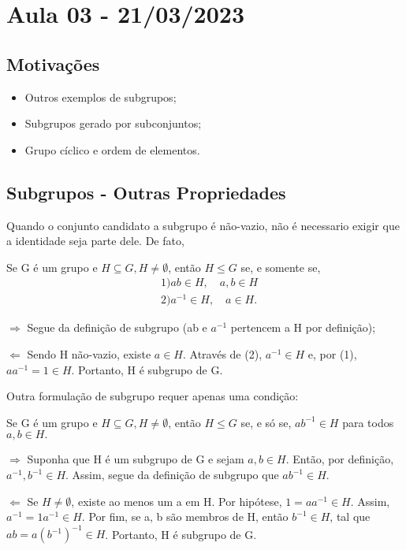 \documentclass[Algebra/algebra_notes.tex]{subfiles}
\begin{document}
\section{Aula 03 - 21/03/2023}
\subsection{Motivações}
\begin{itemize}
	\item Outros exemplos de subgrupos;
	\item Subgrupos gerado por subconjuntos;
	\item Grupo cíclico e ordem de elementos.
\end{itemize}
\subsection{Subgrupos - Outras Propriedades}
Quando o conjunto candidato a subgrupo é não-vazio, não é necessario exigir que a identidade seja parte dele. De fato,
\begin{prop*}
	Se G é um grupo e $H\subseteq{G}, H \neq\emptyset$, então $H\leq{G}$ se, e somente se,
	\begin{align*}
		 & 1) ab\in H, \quad a, b\in H   \\
		 & 2) a^{-1}\in H, \quad a\in H.
	\end{align*}
\end{prop*}
\begin{proof*}
	$\Rightarrow$ Segue da definição de subgrupo (ab e $a^{-1}$ pertencem a H por definição);

	$\Leftarrow$ Sendo H não-vazio, existe $a\in H$. Através de (2), $a^{-1}\in H$ e, por (1), $aa^{-1} = 1\in H.$ Portanto,
	H é subgrupo de G. \qedsymbol
\end{proof*}
Outra formulação de subgrupo requer apenas uma condição:
\begin{prop*}
	Se G é um grupo e $H\subseteq{G}, H \neq\emptyset$, então $H\leq{G}$ se, e só se, $ab^{-1}\in H$ para todos $a, b\in H.$
\end{prop*}
\begin{proof*}
	$\Rightarrow$ Suponha que H é um subgrupo de G e sejam $a, b\in H$. Então, por definição, $a^{-1}, b^{-1}\in H$. Assim,
	segue da definição de subgrupo que $ab^{-1}\in H$.

	$\Leftarrow$ Se $H \neq\emptyset$, existe ao menos um a em H. Por hipótese, $1 = aa^{-1}\in H$. Assim, $a^{-1} = 1a^{-1}\in H$.
	Por fim, se a, b são membros de H, então $b^{-1}\in H$, tal que $ab = a(b^{-1})^{-1}\in H$. Portanto, H é subgrupo de G. \qedsymbol
\end{proof*}
\end{document}
